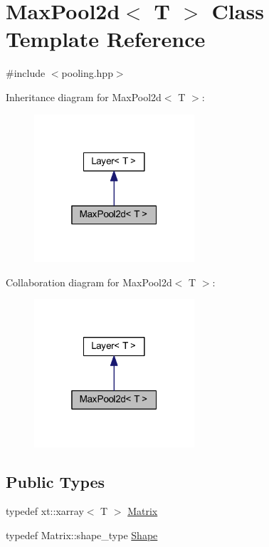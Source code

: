 \hypertarget{class_max_pool2d}{}\section{Max\+Pool2d$<$ T $>$ Class Template Reference}
\label{class_max_pool2d}


{\ttfamily \#include $<$pooling.\+hpp$>$}



Inheritance diagram for Max\+Pool2d$<$ T $>$\+:
\nopagebreak
\begin{figure}[H]
\begin{center}
\leavevmode
\includegraphics[width=169pt]{class_max_pool2d__inherit__graph}
\end{center}
\end{figure}


Collaboration diagram for Max\+Pool2d$<$ T $>$\+:
\nopagebreak
\begin{figure}[H]
\begin{center}
\leavevmode
\includegraphics[width=169pt]{class_max_pool2d__coll__graph}
\end{center}
\end{figure}
\subsection*{Public Types}
\begin{DoxyCompactItemize}
\item 
typedef xt\+::xarray$<$ T $>$ \mbox{\hyperlink{class_max_pool2d_a8e701daf0dfb0e61e36eec865297a4e9}{Matrix}}
\item 
typedef Matrix\+::shape\+\_\+type \mbox{\hyperlink{class_max_pool2d_ad70f776b32f3a19af78573b634d00072}{Shape}}
\end{DoxyCompactItemize}
